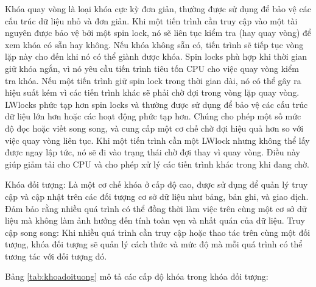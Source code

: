 \documentclass{article}[14pt]
\begin{document}
Khóa quay vòng là loại khóa cực kỳ đơn giản, thường được sử dụng để bảo
vệ các cấu trúc dữ liệu nhỏ và đơn giản. Khi một tiến trình cần truy cập vào một tài nguyên được bảo vệ bởi một spin lock, nó sẽ liên tục kiểm tra (hay quay vòng) để xem khóa có sẵn hay không. Nếu khóa không sẵn có, tiến trình sẽ tiếp tục vòng lặp này cho đến khi nó có thể giành được khóa. Spin locks phù hợp khi thời gian giữ khóa ngắn, vì nó yêu cầu tiến trình tiêu tốn CPU cho việc quay vòng kiểm tra khóa. Nếu một tiến trình giữ spin lock trong thời gian dài, nó có thể gây ra hiệu suất kém vì các tiến trình khác sẽ phải chờ đợi trong vòng lặp quay vòng.
LWlocks phức tạp hơn spin locks và thường được sử dụng để bảo vệ các cấu
trúc dữ liệu lớn hơn hoặc các hoạt động phức tạp hơn. Chúng cho phép một
số mức độ đọc hoặc viết song song, và cung cấp một cơ chế chờ đợi hiệu quả
hơn so với việc quay vòng liên tục. Khi một tiến trình cần một LWlock nhưng không thể lấy được ngay lập tức, nó sẽ đi vào trạng thái chờ đợi thay vì quay vòng. Điều này giúp giảm tải cho CPU và cho phép xử lý các tiến trình khác trong khi đang chờ.

Khóa đối tượng: Là một cơ chế khóa ở cấp độ cao, được sử dụng để quản lý
truy cập và cập nhật trên các đối tượng cơ sở dữ liệu như bảng, bản ghi, và giao dịch. Đảm bảo rằng nhiều quá trình có thể đồng thời làm việc trên cùng một cơ sở dữ liệu mà không làm ảnh hưởng đến tính toàn vẹn và nhất quán của dữ liệu. Truy cập song song: Khi nhiều quá trình cần truy cập hoặc thao tác trên cùng một đối tượng, khóa đối tượng sẽ quản lý cách thức và mức độ mà mỗi quá trình có thể tương tác với đối tượng đó.

Bảng \ref{tab:khoadoituong} mô tả các cấp độ khóa trong khóa đối tượng: 
\end{document}
